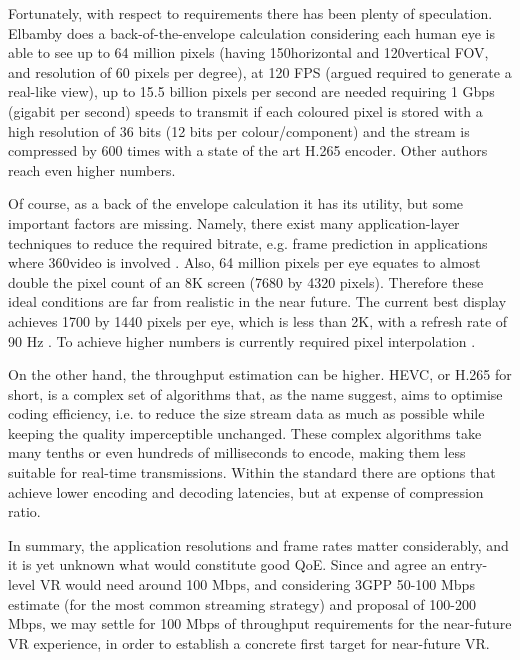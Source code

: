 Fortunately, with respect to requirements there has been plenty of speculation. Elbamby  \cite{Elbamby_towards_low_latency_vr} does a back-of-the-envelope calculation considering each human eye is able to  see up to 64 million pixels (having 150\tdeg horizontal and 120\tdeg vertical \ac{FOV}, and resolution of 60 pixels per degree), at 120 \ac{FPS} (argued required to generate a real-like view), up to 15.5 billion pixels per second are needed requiring 1 Gbps (gigabit per second) speeds to transmit if each coloured pixel is stored with a high resolution of 36 bits (12 bits per colour/component) and the stream is compressed by 600 times with a state of the art H.265 encoder. Other authors \cite{bastug_towards_interconnected_vr} reach even higher numbers.

Of course, as a back of the envelope calculation it has its utility, but some important factors are missing. Namely, there exist many application-layer techniques to reduce the required bitrate, e.g. frame prediction in applications where 360\tdeg video is involved \cite{frame_prediction}. Also, 64 million pixels per eye equates to almost double the pixel count of an 8K screen (7680 by 4320 pixels). Therefore these ideal conditions are far from realistic in the near future. The current best display achieves 1700 by 1440 pixels per eye, which is less than 2K, with a refresh rate of 90 Hz \cite{vive_cosmos_elite}. To achieve higher numbers is currently required  pixel interpolation \cite{pimax}.

On the other hand, the throughput estimation can be higher. \ac{HEVC}, or H.265 for short, is a complex set of algorithms that, as the name suggest, aims to optimise coding efficiency, i.e. to reduce the size stream data as much as possible while keeping the quality imperceptible unchanged. These complex algorithms take many tenths or even hundreds of milliseconds to encode, making them less suitable for real-time transmissions. Within the standard there are options that achieve lower encoding and decoding latencies, but at expense of compression ratio.

In summary, the application resolutions and frame rates matter considerably, and it is yet unknown what would constitute good \ac{QoE}. Since \cite{Elbamby_towards_low_latency_vr} and \cite{vr_on_the_edge} agree an entry-level VR would need around 100 Mbps, and considering 3GPP \cite{3GPP_xr} 50-100 Mbps estimate (for the most common streaming strategy) and \cite{bastug_towards_interconnected_vr} proposal of 100-200 Mbps, we may settle for 100 Mbps of throughput requirements for the near-future VR experience, in order to establish a concrete first target for near-future VR.

